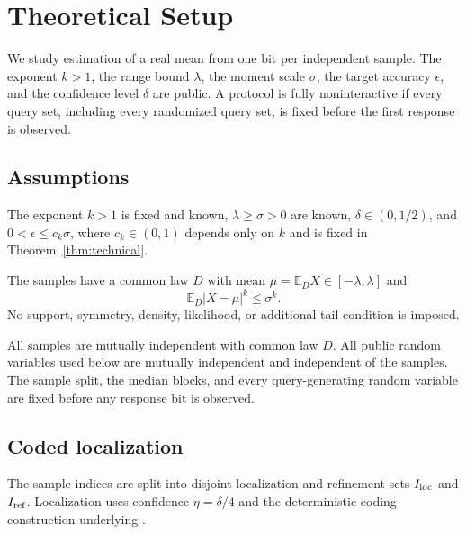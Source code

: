 \section{Theoretical Setup}\label{sec:setup}

We study estimation of a real mean from one bit per independent sample.
The exponent \(k>1\), the range bound \(\lambda\), the moment scale
\(\sigma\), the target accuracy \(\epsilon\), and the confidence level
\(\delta\) are public.  A protocol is fully noninteractive if every query
set, including every randomized query set, is fixed before the first
response is observed.

\subsection{Assumptions}

\begin{assumption}\label{assump:parameter-domain}
The exponent \(k>1\) is fixed and known, \(\lambda\geq\sigma>0\) are known,
\(\delta\in(0,1/2)\), and \(0<\epsilon\leq c_k\sigma\), where
\(c_k\in(0,1)\) depends only on \(k\) and is fixed in
Theorem~\ref{thm:technical}.
\end{assumption}

\begin{assumption}\label{assump:moment-class}
The samples have a common law \(D\) with mean
\(\mu=\mathbb E_DX\in[-\lambda,\lambda]\) and
\[
\mathbb E_D|X-\mu|^k\leq\sigma^k.
\]
No support, symmetry, density, likelihood, or additional tail condition is
imposed.
\end{assumption}

\begin{assumption}\label{assump:iid-independent-randomness}
All samples are mutually independent with common law \(D\).  All public
random variables used below are mutually independent and independent of the
samples.  The sample split, the median blocks, and every query-generating
random variable are fixed before any response bit is observed.
\end{assumption}

\subsection{Coded localization}

The sample indices are split into disjoint localization and refinement sets
\(I_{\rm loc}\) and \(I_{\rm ref}\).  Localization uses confidence
\(\eta=\delta/4\) and the deterministic coding construction underlying
\citet[Theorem~16]{lau2026orderoptimal}.

